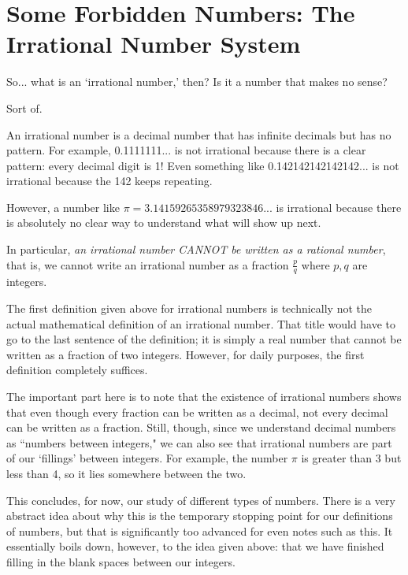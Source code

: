 \documentclass[openany]{book}
\begin{document}
\section{Some Forbidden Numbers: The Irrational Number System}
So... what is an `irrational number,' then? Is it a number that makes no sense?\par
Sort of.
\begin{definition}
	An irrational number is a decimal number that has infinite decimals but has no pattern. For example, 0.1111111... is not irrational because there is a clear pattern: every decimal digit is 1! Even something like 0.142142142142142... is not irrational because the 142 keeps repeating.\par
	However, a number like $\pi=3.14159265358979323846...$ is irrational because there is absolutely no clear way to understand what will show up next.\par
	In particular, \textit{an irrational number CANNOT be written as a rational number}, that is, we cannot write an irrational number as a fraction $\frac{p}{q}$ where $p,q$ are integers.
\end{definition}
\begin{remark}
	The first definition given above for irrational numbers is technically not the actual mathematical definition of an irrational number. That title would have to go to the last sentence of the definition; it is simply a real number that cannot be written as a fraction of two integers. However, for daily purposes, the first definition completely suffices.
\end{remark}
The important part here is to note that the existence of irrational numbers shows that even though every fraction can be written as a decimal, not every decimal can be written as a fraction. Still, though, since we understand decimal numbers as ``numbers between integers," we can also see that irrational numbers are part of our `fillings' between integers. For example, the number $\pi$ is greater than 3 but less than 4, so it lies somewhere between the two.\par
This concludes, for now, our study of different types of numbers. There is a very abstract idea about why this is the temporary stopping point for our definitions of numbers, but that is significantly too advanced for even notes such as this. It essentially boils down, however, to the idea given above: that we have finished filling in the blank spaces between our integers.
\end{document}
